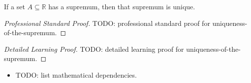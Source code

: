 \begin{proposition*}
If a set $A \subseteq \mathbb{R}$ has a supremum, then that supremum is unique.
\end{proposition*}

\begin{proof}[Professional Standard Proof]
\LRAProofBodyStart
TODO: professional standard proof for uniqueness-of-the-supremum.
\end{proof}

\begin{proof}[Detailed Learning Proof]
\LRAProofBodyStart
TODO: detailed learning proof for uniqueness-of-the-supremum.
\end{proof}

\begin{remark*}
\end{remark*}

\begin{dependencies}
\begin{itemize}
  \item TODO: list mathematical dependencies.
\end{itemize}
\end{dependencies}

